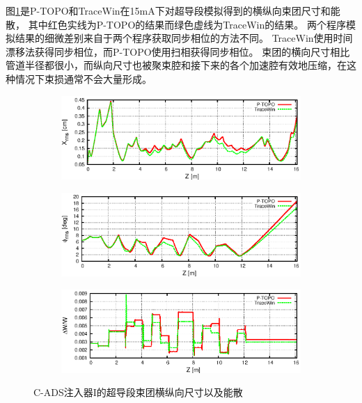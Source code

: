 图\ref{fig:ADS_SC_size}是P-TOPO和TraceWin在15mA下对超导段模拟得到的横纵向束团尺寸和能散，
其中红色实线为P-TOPO的结果而绿色虚线为TraceWin的结果。
两个程序模拟结果的细微差别来自于两个程序获取同步相位的方法不同。
TraceWin使用时间漂移法获得同步相位，而P-TOPO使用扫相获得同步相位。
束团的横向尺寸相比管道半径都很小，而纵向尺寸也被聚束腔和接下来的各个加速腔有效地压缩，在这种情况下束损通常不会大量形成。
\begin{figure}[!htb]
    \centering
    \begin{subfigure}[b]{0.9\textwidth}
        \includegraphics[width=\textwidth]{Img/ADS_SC_size1.eps}
    \end{subfigure}
    \begin{subfigure}[b]{0.9\textwidth}
        \includegraphics[width=\textwidth]{Img/ADS_SC_size2.eps}
    \end{subfigure}
    \begin{subfigure}[b]{0.9\textwidth}
        \includegraphics[width=\textwidth]{Img/ADS_SC_size3.eps}
    \end{subfigure}
    \caption{C-ADS注入器I的超导段束团横纵向尺寸以及能散}\label{fig:ADS_SC_size}
\end{figure}

